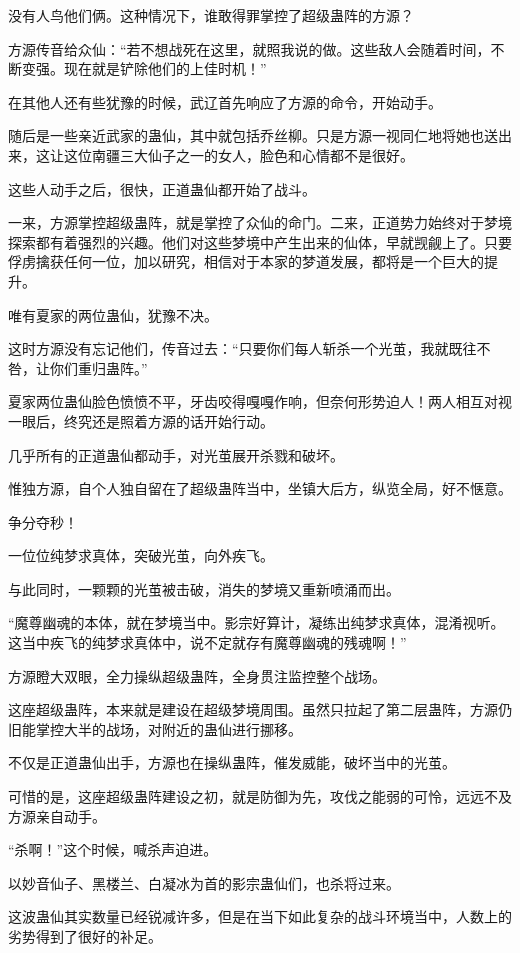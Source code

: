 \begin{this_body}
没有人鸟他们俩。这种情况下，谁敢得罪掌控了超级蛊阵的方源？

方源传音给众仙：“若不想战死在这里，就照我说的做。这些敌人会随着时间，不断变强。现在就是铲除他们的上佳时机！”

在其他人还有些犹豫的时候，武辽首先响应了方源的命令，开始动手。

随后是一些亲近武家的蛊仙，其中就包括乔丝柳。只是方源一视同仁地将她也送出来，这让这位南疆三大仙子之一的女人，脸色和心情都不是很好。

这些人动手之后，很快，正道蛊仙都开始了战斗。

一来，方源掌控超级蛊阵，就是掌控了众仙的命门。二来，正道势力始终对于梦境探索都有着强烈的兴趣。他们对这些梦境中产生出来的仙体，早就觊觎上了。只要俘虏擒获任何一位，加以研究，相信对于本家的梦道发展，都将是一个巨大的提升。

唯有夏家的两位蛊仙，犹豫不决。

这时方源没有忘记他们，传音过去：“只要你们每人斩杀一个光茧，我就既往不咎，让你们重归蛊阵。”

夏家两位蛊仙脸色愤愤不平，牙齿咬得嘎嘎作响，但奈何形势迫人！两人相互对视一眼后，终究还是照着方源的话开始行动。

几乎所有的正道蛊仙都动手，对光茧展开杀戮和破坏。

惟独方源，自个人独自留在了超级蛊阵当中，坐镇大后方，纵览全局，好不惬意。

争分夺秒！

一位位纯梦求真体，突破光茧，向外疾飞。

与此同时，一颗颗的光茧被击破，消失的梦境又重新喷涌而出。

“魔尊幽魂的本体，就在梦境当中。影宗好算计，凝练出纯梦求真体，混淆视听。这当中疾飞的纯梦求真体中，说不定就存有魔尊幽魂的残魂啊！”

方源瞪大双眼，全力操纵超级蛊阵，全身贯注监控整个战场。

这座超级蛊阵，本来就是建设在超级梦境周围。虽然只拉起了第二层蛊阵，方源仍旧能掌控大半的战场，对附近的蛊仙进行挪移。

不仅是正道蛊仙出手，方源也在操纵蛊阵，催发威能，破坏当中的光茧。

可惜的是，这座超级蛊阵建设之初，就是防御为先，攻伐之能弱的可怜，远远不及方源亲自动手。

“杀啊！”这个时候，喊杀声迫进。

以妙音仙子、黑楼兰、白凝冰为首的影宗蛊仙们，也杀将过来。

这波蛊仙其实数量已经锐减许多，但是在当下如此复杂的战斗环境当中，人数上的劣势得到了很好的补足。


\end{this_body}
